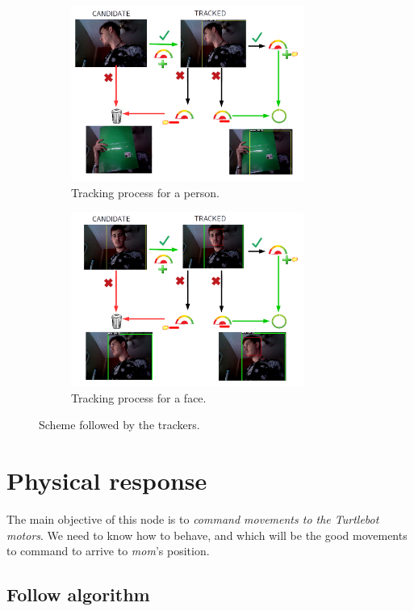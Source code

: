 	\begin{figure}[h]
		\centering
		\begin{subfigure}[b]{0.4\linewidth}
			\centering
			\includegraphics[width=3in]{images/person_tracker}
			\caption{Tracking process for a person.}
			\label{fig:6_person_tracker}
		\end{subfigure}
		\hfill
		\begin{subfigure}[b]{0.4\linewidth}
			\centering
			\includegraphics[width=3in]{images/face_tracker}
			\caption{Tracking process for a face.}
			\label{fig:6_face_tracker}
		\end{subfigure}
		\caption{Scheme followed by the trackers.}
		\label{fig:6_trackers}
	\end{figure}

\section{Physical response}

		The main objective of this node is to \emph{command movements to the Turtlebot motors}. We need to know how to behave, and which will be the good movements to command to arrive to \emph{mom}'s position.
		
	\subsection{Follow algorithm}
		
